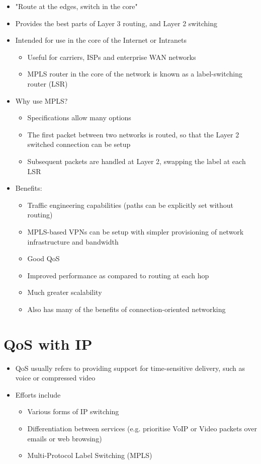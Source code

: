 \begin{itemize}
  \item "Route at the edges, switch in the core"
  \item Provides the best parts of Layer 3 routing, and Layer 2 switching
  \item Intended for use in the core of the Internet or Intranets
  \begin{itemize}
    \item Useful for carriers, ISPs and enterprise WAN networks
    \item MPLS router in the core of the network is known as a label-switching router (LSR)
  \end{itemize}
  \item Why use MPLS?
  \begin{itemize}
    \item Specifications allow many options
    \item The first packet between two networks is routed, so that the Layer 2 switched connection can be setup
    \item Subsequent packets are handled at Layer 2, swapping the label at each LSR
  \end{itemize}
  \item Benefits:
  \begin{itemize}
    \item Traffic engineering capabilities (paths can be explicitly set without routing)
    \item MPLS-based VPNs can be setup with simpler provisioning of network infrastructure and bandwidth
    \item Good QoS
    \item Improved performance as compared to routing at each hop
    \item Much greater scalability
    \item Also has many of the benefits of connection-oriented networking
  \end{itemize}
\end{itemize}

\section*{QoS with IP}

\begin{itemize}
  \item QoS usually refers to providing support for time-sensitive delivery, such as voice or compressed video
  \item Efforts include
  \begin{itemize}
    \item Various forms of IP switching
    \item Differentiation between services (e.g. prioritise VoIP or Video packets over emails or web browsing)
    \item Multi-Protocol Label Switching (MPLS)
  \end{itemize}
\end{itemize}